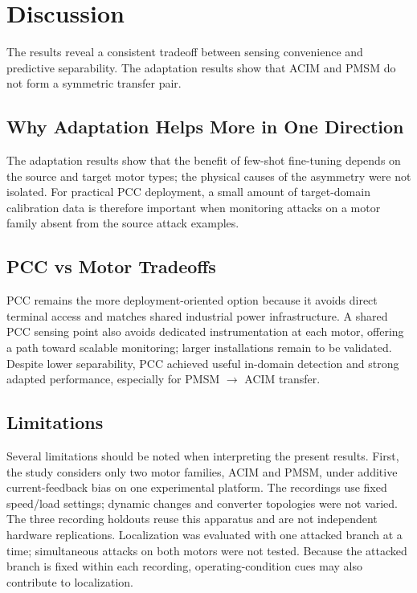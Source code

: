 \documentclass[letterpaper,journal]{IEEEtran}
\begin{document}
\section{Discussion}
\label{sec:discussion}

The results reveal a consistent tradeoff between sensing convenience and predictive separability. The adaptation results show that ACIM and PMSM do not form a symmetric transfer pair.
\subsection{Why Adaptation Helps More in One Direction}
\label{sec:adaptation_asymmetry}

The adaptation results show that the benefit of few-shot fine-tuning depends on the source and target motor types; the physical causes of the asymmetry were not isolated. For practical PCC deployment, a small amount of target-domain calibration data is therefore important when monitoring attacks on a motor family absent from the source attack examples.

\subsection{PCC vs Motor Tradeoffs}
\label{sec:pcc_vs_motor}



PCC remains the more deployment-oriented option because it avoids direct terminal access and matches shared industrial power infrastructure. A shared PCC sensing point also avoids dedicated instrumentation at each motor, offering a path toward scalable monitoring; larger installations remain to be validated. Despite lower separability, PCC achieved useful in-domain detection and strong adapted performance, especially for PMSM $\rightarrow$ ACIM transfer.



\subsection{Limitations}
\label{sec:limitations}

Several limitations should be noted when interpreting the present results. First, the study considers only two motor families, ACIM and PMSM, under additive current-feedback bias on one experimental platform. The recordings use fixed speed/load settings; dynamic changes and converter topologies were not varied. The three recording holdouts reuse this apparatus and are not independent hardware replications. Localization was evaluated with one attacked branch at a time; simultaneous attacks on both motors were not tested. Because the attacked branch is fixed within each recording, operating-condition cues may also contribute to localization.
\end{document}
